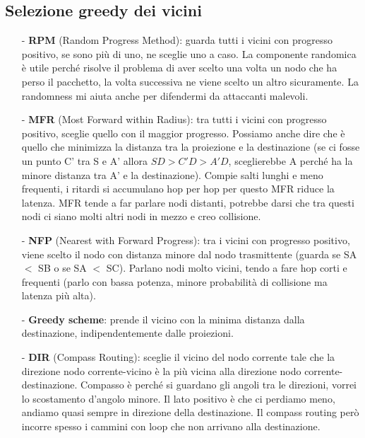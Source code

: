 \documentclass[12pt,italian]{report}
\begin{document}
\subsection{Selezione greedy dei vicini}
\begin{itemize}
    \item [-] \textbf{RPM} (Random Progress Method): guarda tutti i vicini con progresso positivo, se sono più di uno, ne sceglie uno a caso.
    \bigbreak
    La componente randomica è utile perché risolve il problema di aver scelto una volta un nodo che ha perso il pacchetto, la volta successiva ne viene scelto un altro sicuramente. La randomness mi aiuta anche per difendermi da attaccanti malevoli.
    \item [-] \textbf{MFR} (Most Forward within Radius): tra tutti i vicini con progresso positivo, sceglie quello con il maggior progresso. Possiamo anche dire che è quello che minimizza la distanza tra la proiezione e la destinazione (se ci fosse un punto C' tra S e A' allora $SD > C'D > A'D$, sceglierebbe A perché ha la minore distanza tra A' e la destinazione). 
    \bigbreak
    Compie salti lunghi e meno frequenti, i ritardi si accumulano hop per hop per questo MFR riduce la latenza. MFR tende a far parlare nodi distanti, potrebbe darsi che tra questi nodi ci siano molti altri nodi in mezzo e creo collisione. 
    \item [-] \textbf{NFP} (Nearest with Forward Progress): tra i vicini con progresso positivo, viene scelto il nodo con distanza minore dal nodo trasmittente (guarda se SA $<$ SB o se SA $<$ SC). 
    \bigbreak
    Parlano nodi molto vicini, tendo a fare hop corti e frequenti (parlo con bassa potenza, minore probabilità di collisione ma latenza più alta). 
    \item [-] \textbf{Greedy scheme}: prende il vicino con la minima distanza dalla destinazione, indipendentemente dalle proiezioni.
    \item [-] \textbf{DIR} (Compass Routing): sceglie il vicino del nodo corrente tale che la direzione nodo corrente-vicino è la più vicina alla direzione nodo corrente-destinazione. Compasso è perché si guardano gli angoli tra le direzioni, vorrei lo scostamento d'angolo minore. 
    \bigbreak
    Il lato positivo è che ci perdiamo meno, andiamo quasi sempre in direzione della destinazione. Il compass routing però incorre spesso i cammini con loop che non arrivano alla destinazione.
\end{itemize}
\end{document}
